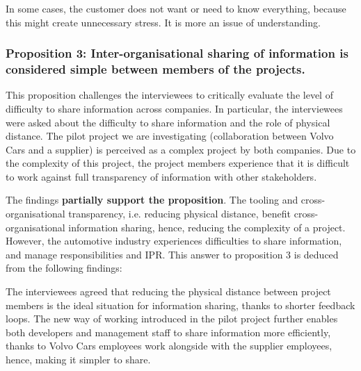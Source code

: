 
 In some cases, the customer does not want or need to know everything, because this might create unnecessary stress. It is more an issue of understanding. 


\vspace{.2cm}
\subsubsection{Proposition 3: Inter-organisational sharing of information is considered simple between members of the projects.}

This proposition challenges the interviewees to critically evaluate the level of difficulty to share information across companies. In particular, the interviewees were asked about the difficulty to share information and the role of physical distance. The pilot project we are investigating (collaboration between Volvo Cars and a supplier) is perceived as a complex project by both companies. Due to the complexity of this project, the project members experience that it is difficult to work against full transparency of information with other stakeholders. 

The findings {\bf partially support the proposition}. The tooling and cross-organisational transparency, i.e. reducing physical distance, benefit cross-organisational information sharing, hence, reducing the complexity of a project. However, the automotive industry experiences difficulties to share information, and manage responsibilities and IPR. This answer to proposition 3 is deduced from the following findings:

 The interviewees agreed that reducing the physical distance between project members is the ideal situation for information sharing, thanks to shorter feedback loops. The new way of working introduced in the pilot project further enables both developers and management staff to share information more efficiently, thanks to Volvo Cars employees work alongside with the supplier employees, hence, making it simpler to share. 

